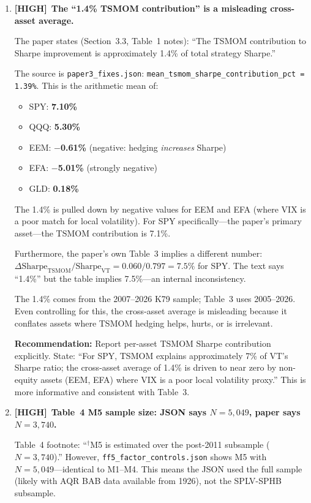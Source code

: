 \documentclass[12pt,a4paper]{article}
\newcommand{\HIGH}{\textcolor{highsev}{\textbf{[HIGH]}}}
\begin{document}
\begin{enumerate}[label=\textbf{B.\arabic*}]

\item \HIGH\ \textbf{The ``1.4\% TSMOM contribution'' is a misleading cross-asset average.}

The paper states (Section~3.3, Table~1 notes): ``The TSMOM contribution to Sharpe improvement is approximately 1.4\% of total strategy Sharpe.''

The source is \texttt{paper3\_fixes.json}: \texttt{mean\_tsmom\_sharpe\_contribution\_pct = 1.39\%}. This is the arithmetic mean of:
\begin{itemize}
    \item SPY: \textbf{7.10\%}
    \item QQQ: \textbf{5.30\%}
    \item EEM: \textbf{$-$0.61\%} (negative: hedging \textit{increases} Sharpe)
    \item EFA: \textbf{$-$5.01\%} (strongly negative)
    \item GLD: \textbf{0.18\%}
\end{itemize}

The 1.4\% is pulled down by negative values for EEM and EFA (where VIX is a poor match for local volatility). For SPY specifically---the paper's primary asset---the TSMOM contribution is 7.1\%.

Furthermore, the paper's own Table~3 implies a different number: $\Delta\text{Sharpe}_\text{TSMOM} / \text{Sharpe}_\text{VT} = 0.060 / 0.797 = 7.5\%$ for SPY. The text says ``1.4\%'' but the table implies 7.5\%---an internal inconsistency.

The 1.4\% comes from the 2007--2026 K79 sample; Table~3 uses 2005--2026. Even controlling for this, the cross-asset average is misleading because it conflates assets where TSMOM hedging helps, hurts, or is irrelevant.

\textbf{Recommendation:} Report per-asset TSMOM Sharpe contribution explicitly. State: ``For SPY, TSMOM explains approximately 7\% of VT's Sharpe ratio; the cross-asset average of 1.4\% is driven to near zero by non-equity assets (EEM, EFA) where VIX is a poor local volatility proxy.'' This is more informative and consistent with Table~3.


\item \HIGH\ \textbf{Table~4 M5 sample size: JSON says $N = 5{,}049$, paper says $N = 3{,}740$.}

Table~4 footnote: ``$^\dagger$M5 is estimated over the post-2011 subsample ($N = 3{,}740$).'' However, \texttt{ff5\_factor\_controls.json} shows M5 with \textbf{$N = 5{,}049$}---identical to M1--M4. This means the JSON used the full sample (likely with AQR BAB data available from 1926), not the SPLV-SPHB subsample.


\end{enumerate}
\end{document}
